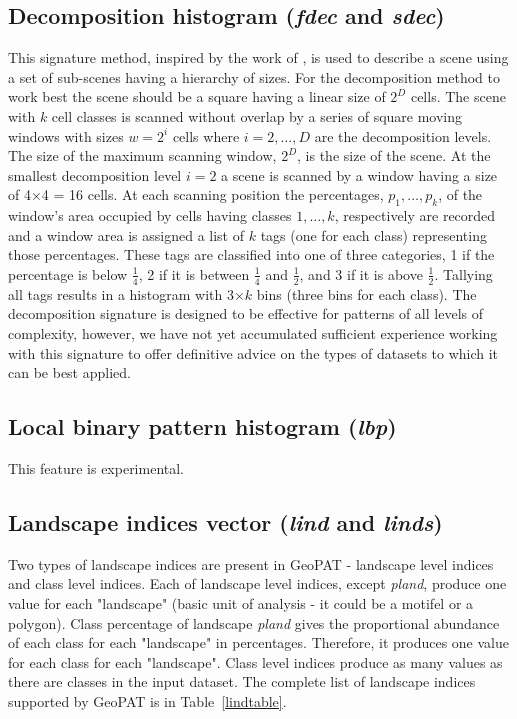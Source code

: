 \subsection{Decomposition histogram ({\it fdec} and {\it sdec})}

This signature method, inspired by the work of \cite{Remmel2006}, is used to describe a scene using a set of sub-scenes having a hierarchy of sizes. 
For the decomposition method to work best the scene should be a square having a linear size of $2^{D}$ cells.
The scene with $k$ cell classes is scanned without overlap by a series of square moving windows with sizes $w=2^{i}$ cells where $i=2, \ldots, D$ are the decomposition levels. 
The size of the maximum scanning window, $2^D$, is the size of the scene. 
At the smallest decomposition level $i=2$ a scene is scanned by a window having a size of 4$\times$4 = 16 cells. 
At each scanning position the percentages, ${p_1, \ldots, p_k}$, of the window's area occupied by cells having classes ${1, \ldots, k}$, respectively are recorded and a window area is assigned a list of $k$ tags (one for each class) representing those percentages. 
These tags are classified into one of three categories, 1 if the percentage is below $\frac{1}{4}$, 2 if it is between $\frac{1}{4}$ and $\frac{1}{2}$, and 3 if it is above $\frac{1}{2}$. 
Tallying all tags results in a histogram with 3$\times k$ bins (three bins for each class).  
The decomposition signature is designed to be effective for patterns of all levels of complexity, however, we have not yet accumulated sufficient experience working with this signature to offer definitive advice on the types of datasets to which it can be best applied. 

\subsection{Local binary pattern histogram ({\it lbp})}

This feature is experimental.

\subsection{Landscape indices vector ({\it lind} and {\it linds})}

Two types of landscape indices are present in GeoPAT - landscape level indices and class level indices.
Each of landscape level indices, except {\it pland}, produce one value for each "landscape" (basic unit of analysis - it could be a motifel or a polygon).
Class percentage of landscape {\it pland} gives the proportional abundance of each class for each "landscape" in percentages.
Therefore, it produces one value for each class for each "landscape". 
Class level indices produce as many values as there are classes in the input dataset.
The complete list of landscape indices supported by GeoPAT is in Table~\ref{lindtable}.

